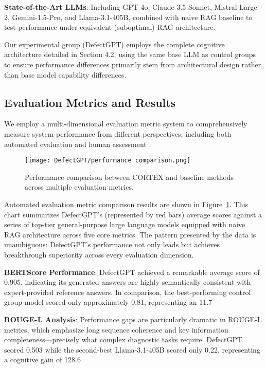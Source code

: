 \textbf{State-of-the-Art LLMs}: Including GPT-4o, Claude 3.5 Sonnet, Mistral-Large-2, Gemini-1.5-Pro, and Llama-3.1-405B, combined with naive RAG baseline to test performance under equivalent (suboptimal) RAG architecture.

Our experimental group (DefectGPT) employs the complete cognitive architecture detailed in Section 4.2, using the same base LLM as control groups to ensure performance differences primarily stem from architectural design rather than base model capability differences.

\subsection{Evaluation Metrics and Results}

We employ a multi-dimensional evaluation metric system to comprehensively measure system performance from different perspectives, including both automated evaluation and human assessment \cite{hernandez2022measuring}.

\begin{figure}[htbp]
\centering
\texttt{[image: DefectGPT/performance comparison.png]}
\caption{Performance comparison between CORTEX and baseline methods across multiple evaluation metrics.}
\label{fig:performance-comparison}
\end{figure}

Automated evaluation metric comparison results are shown in Figure~\ref{fig:performance-comparison}. This chart summarizes DefectGPT's (represented by red bars) average scores against a series of top-tier general-purpose large language models equipped with naive RAG architecture across five core metrics. The pattern presented by the data is unambiguous: DefectGPT's performance not only leads but achieves breakthrough superiority across every evaluation dimension.

\textbf{BERTScore Performance}: DefectGPT achieved a remarkable average score of 0.905, indicating its generated answers are highly semantically consistent with expert-provided reference answers. In comparison, the best-performing control group model scored only approximately 0.81, representing an 11.7%

\textbf{ROUGE-L Analysis}: Performance gaps are particularly dramatic in ROUGE-L metrics, which emphasize long sequence coherence and key information completeness—precisely what complex diagnostic tasks require. DefectGPT scored 0.503 while the second-best Llama-3.1-405B scored only 0.22, representing a cognitive gain of 128.6%

